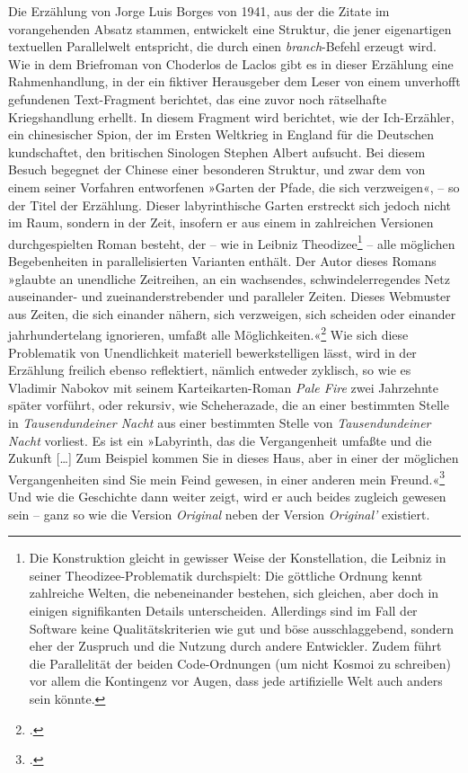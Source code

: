 \documentclass[a4paper,11pt]{article}
\newcommand{\anf}[1]{»#1«}
\begin{document}
Die Erzählung von Jorge Luis Borges von 1941, aus der die Zitate im vorangehenden Absatz stammen, entwickelt eine Struktur, die jener eigenartigen textuellen Parallelwelt entspricht, die durch einen \emph{branch}-Befehl erzeugt wird. Wie in dem Briefroman von Choderlos de Laclos gibt es in dieser Erzählung eine Rahmenhandlung, in der ein fiktiver Herausgeber dem Leser von einem unverhofft gefundenen Text-Fragment berichtet, das eine zuvor noch rätselhafte Kriegshandlung erhellt. In diesem Fragment wird berichtet, wie der Ich-Erzähler, ein chinesischer Spion, der im Ersten Weltkrieg in England für die Deutschen kundschaftet, den britischen Sinologen Stephen Albert aufsucht. Bei diesem Besuch begegnet der Chinese einer besonderen Struktur, und zwar dem von einem seiner Vorfahren entworfenen \anf{Garten der Pfade, die sich verzweigen}, – so der Titel der Erzählung. Dieser labyrinthische Garten erstreckt sich jedoch nicht im Raum, sondern in der Zeit, insofern er aus einem in zahlreichen Versionen durchgespielten Roman besteht, der – wie in Leibniz Theodizee\footnote{Die Konstruktion gleicht in gewisser Weise der Konstellation, die Leibniz in seiner Theodizee-Problematik durchspielt: Die göttliche Ordnung kennt zahlreiche Welten, die nebeneinander bestehen, sich gleichen, aber doch in einigen signifikanten Details unterscheiden. Allerdings sind im Fall der Software keine Qualitätskriterien wie gut und böse ausschlaggebend, sondern eher der Zuspruch und die Nutzung durch andere Entwickler. Zudem führt die Parallelität der beiden Code-Ordnungen (um nicht Kosmoi zu schreiben) vor allem die Kontingenz vor Augen, dass jede artifizielle Welt auch anders sein könnte.} – alle möglichen Begebenheiten in parallelisierten Varianten enthält. Der Autor dieses Romans \anf{glaubte an unendliche Zeitreihen, an ein wachsendes, schwindelerregendes Netz auseinander- und zueinanderstrebender und paralleler Zeiten. Dieses Webmuster aus Zeiten, die sich einander nähern, sich verzweigen, sich scheiden oder einander jahrhundertelang ignorieren, umfaßt alle Möglichkeiten.}\footcite[172]{borges:1941} Wie sich diese Problematik von Unendlichkeit materiell bewerkstelligen lässt, wird in der Erzählung freilich ebenso reflektiert, nämlich entweder zyklisch, so wie es Vladimir Nabokov mit seinem Karteikarten-Roman \emph{Pale Fire} zwei Jahrzehnte später vorführt, oder rekursiv, wie Scheherazade, die an einer bestimmten Stelle in \emph{Tausendundeiner Nacht} aus einer bestimmten Stelle von \emph{Tausendundeiner Nacht} vorliest. Es ist ein \anf{Labyrinth, das die Vergangenheit umfaßte und die Zukunft [\ldots] Zum Beispiel kommen Sie in dieses Haus, aber in einer der möglichen Vergangenheiten sind Sie mein Feind gewesen, in einer anderen mein Freund.}\footcite[166/170]{borges:1941} Und wie die Geschichte dann weiter zeigt, wird er auch beides zugleich gewesen sein – ganz so wie die Version \emph{Original} neben der Version \emph{Original'} existiert. %
\end{document}
